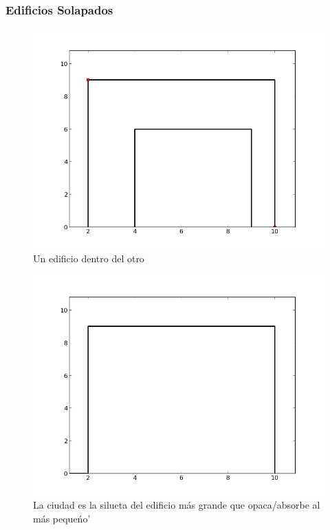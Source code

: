 \subsubsection*{Edificios Solapados}
\begin{figure}[H]
\begin{center}
\includegraphics[scale=0.5]{./imagenes/ej2_edificio4.png}
\caption{Un edificio dentro del otro}
\end{center}
\end{figure}
\begin{figure}[H]
\begin{center}
\includegraphics[scale=0.5]{./imagenes/ej2_edificio4solucion.png}
\caption{La ciudad es la silueta del edificio m\'as grande que opaca/absorbe al m\'as peque\'no'}
\end{center}
\end{figure}

